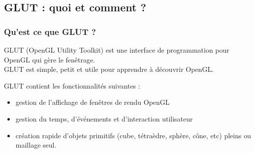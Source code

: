 \documentclass{beamer}
\begin{document}
\subsection{GLUT : quoi et comment ?}
\begin{frame}[fragile]
\frametitle{Qu'est ce que GLUT ?}
	\begin{block}{}
		GLUT (OpenGL Utility Toolkit) est une interface de programmation pour OpenGL qui gère le fenêtrage.\\
		GLUT est simple, petit et utile pour apprendre à découvrir OpenGL.
	\end{block}
	\begin{block}{}
		GLUT contient les fonctionnalités suivantes :
		\begin{itemize}
			\item gestion de l'affichage de fenêtres de rendu OpenGL
			\item gestion du temps, d'événements et d'interaction utilisateur
			\item création rapide d'objets primitifs (cube, tétraèdre, sphère, cône, etc) pleins ou maillage seul.
		\end{itemize}
	\end{block}
	\begin{overlayarea}{\textwidth}{5cm}
\end{overlayarea}
\end{frame}
\end{document}
